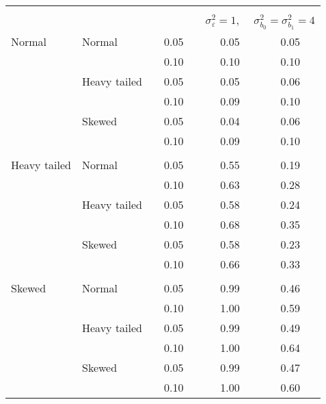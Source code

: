 \begin{table}[ht]
\begin{scriptsize}
\begin{tabular}{ll p{.1cm} c p{.1cm} cc}
&&&&&&\\
  & && && \multicolumn{2}{c}{$\sigma_{\varepsilon}^2 = 1$, \ \ $\sigma_{b_0}^2 = \sigma_{b_1}^2 = 4$} \\ \cline{6-7}
\rowcolor{gray!20}Normal       & Normal       && 0.05 &&  0.05 & 0.05 \\ 
\rowcolor{gray!20}             &              && 0.10 &&  0.10 & 0.10 \\ 
\rowcolor{gray!20}             & Heavy tailed && 0.05 &&  0.05 & 0.06 \\ 
\rowcolor{gray!20}             &              && 0.10 &&  0.09 & 0.10 \\ 
\rowcolor{gray!20}             & Skewed       && 0.05 &&  0.04 & 0.06 \\ 
\rowcolor{gray!20}             &              && 0.10 &&  0.09 & 0.10 \\ 
             &&&&&&\\
Heavy tailed & Normal       && 0.05 &&  0.55 & 0.19 \\ 
             &              && 0.10 &&  0.63 & 0.28 \\ 
             & Heavy tailed && 0.05 &&  0.58 & 0.24 \\ 
             &              && 0.10 &&  0.68 & 0.35 \\ 
             & Skewed       && 0.05 &&  0.58 & 0.23 \\ 
             &              && 0.10 &&  0.66 & 0.33 \\ 
             &&&&&&\\
Skewed       & Normal       && 0.05 &&  0.99 & 0.46 \\ 
             &              && 0.10 &&  1.00 & 0.59 \\ 
             & Heavy tailed && 0.05 &&  0.99 & 0.49 \\ 
             &              && 0.10 &&  1.00 & 0.64 \\ 
             & Skewed       && 0.05 &&  0.99 & 0.47 \\ 
             &              && 0.10 &&  1.00 & 0.60 \\ 


   \hline
\end{tabular}
\end{scriptsize}
\end{table}
